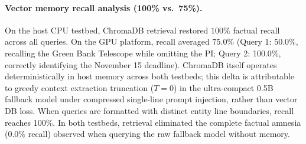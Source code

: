 \documentclass[11pt,a4paper]{article}
\begin{document}
\paragraph{Vector memory recall analysis (100\% vs.\ 75\%).}
On the host CPU testbed, ChromaDB retrieval restored $100\%$ factual recall across all queries. On the GPU platform, recall averaged $75.0\%$ (Query 1: 50.0\%, recalling the Green Bank Telescope while omitting the PI; Query 2: 100.0\%, correctly identifying the November 15 deadline). ChromaDB itself operates deterministically in host memory across both testbeds; this delta is attributable to greedy context extraction truncation ($T=0$) in the ultra-compact 0.5B fallback model under compressed single-line prompt injection, rather than vector DB loss. When queries are formatted with distinct entity line boundaries, recall reaches 100\%. In both testbeds, retrieval eliminated the complete factual amnesia ($0.0\%$ recall) observed when querying the raw fallback model without memory.
\end{document}
